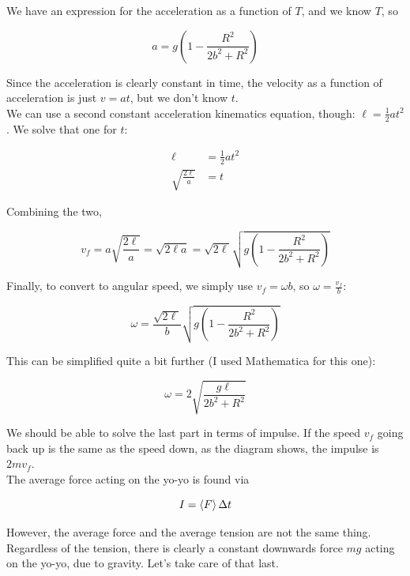 \documentclass[8.01x]{subfiles}
\begin{document}
We have an expression for the acceleration as a function of $T$, and we know $T$, so

\begin{equation}
a = g \left(1 - \frac{R^2}{2 b^2 + R^2}\right)
\end{equation}

Since the acceleration is clearly constant in time, the velocity as a function of acceleration is just $v = a t$, but we don't know $t$.\\
We can use a second constant acceleration kinematics equation, though: $\ell = \frac{1}{2} a t^2$. We solve that one for $t$:

\begin{align}
\ell &= \frac{1}{2} a t^2\\
\sqrt{\frac{2 \ell}{a}} &= t
\end{align}

Combining the two,

\begin{equation}
v_f = a \sqrt{\frac{2 \ell}{a}} = \sqrt{2 \ell a} = \sqrt{2 \ell} \sqrt{g \left(1 - \frac{R^2}{2 b^2 + R^2}\right)}
\end{equation}

Finally, to convert to angular speed, we simply use $v_f = \omega b$, so $\omega = \frac{v_f}{b}$:

\begin{equation}
\omega = \frac{\sqrt{2 \ell}}{b} \sqrt{g \left(1 - \frac{R^2}{2 b^2 + R^2}\right)}
\end{equation}

This can be simplified quite a bit further (I used Mathematica for this one):

\begin{equation}
\omega = 2 \sqrt{\frac{g \ell}{2 b^2 + R^2}}
\end{equation}

We should be able to solve the last part in terms of impulse. If the speed $v_f$ going back up is the same as the speed down, as the diagram shows, the impulse is $2 m v_f$.\\
The average force acting on the yo-yo is found via

\begin{equation}
I = \Braket{F} \Delta t
\end{equation}

However, the average force and the average tension are not the same thing. Regardless of the tension, there is clearly a constant downwards force $m g$ acting on the yo-yo, due to gravity. Let's take care of that last.
\end{document}
